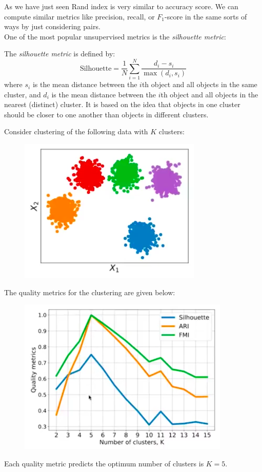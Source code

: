 As we have just seen Rand index is very similar to accuracy score. We can compute similar metrics like precision, recall, or $F_1$-score in the same sorts of ways by just considering pairs.\\

One of the most popular unsupervised metrics is the \textit{silhouette metric}:
\begin{framedef}
The \textit{silhouette metric} is defined by:
\begin{equation*}
\textrm{Silhouette} = \frac{1}{N} \sum_{i=1}^{N} \frac{d_i  - s_i}{\max(d_i ,s_i)}
\end{equation*}
where $s_i$ is the mean distance between the $i$th object and all objects in the same cluster, and $d_i$ is the mean distance between the $i$th object and all objects in the nearest (distinct) cluster. It is based on the idea that objects in one cluster should be closer to one another than objects in different clusters.
\end{framedef}

\begin{frameex}
Consider clustering of the following data with $K$ clusters:
\begin{figure}[H]
\centering
\includegraphics[scale=0.4]{clusterquality1.png}
\end{figure}
The quality metrics for the clustering are given below:
\begin{figure}[H]
\centering
\includegraphics[scale=0.4]{clusterquality2.png}
\end{figure}
Each quality metric predicts the optimum number of clusters is $K=5$.
\end{frameex}











